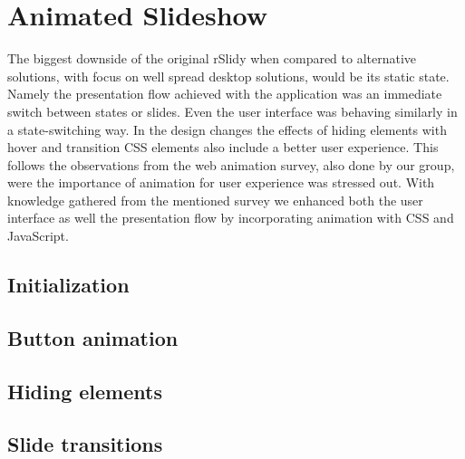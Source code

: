 %
%
% 
% 
% 


\chapter{Animated Slideshow}

\label{chap:animated}

The biggest downside of the original rSlidy when compared to alternative solutions, with focus on well spread desktop solutions, would be its static state. Namely the presentation flow achieved with the application was an immediate switch between states or slides. Even the user interface was behaving similarly in a state-switching way. In the design changes the effects of hiding elements with hover and transition CSS elements also include a better user experience. This follows the observations from the web animation survey, also done by our group, were the importance of animation for user experience was stressed out. With knowledge gathered from the mentioned survey we enhanced both the user interface as well the presentation flow by incorporating animation with CSS and JavaScript.

\section{Initialization} %
\label{sec:initialization}


\section{Button animation} %
\label{sec:button_animation}


\section{Hiding elements} %
\label{sec:hiding_elements}


\section{Slide transitions} %
\label{sec:slide_transitions}

